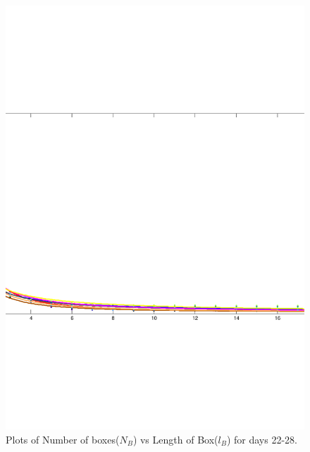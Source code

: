 \documentclass{article}
\begin{document}
\begin{figure}
\centering
\includegraphics[scale=0.3]{plot4/plot4}
\caption{Plots of Number of boxes($N_B$) vs Length of Box($l_B$) for days 22-28.}
\end{figure}
\end{document}
